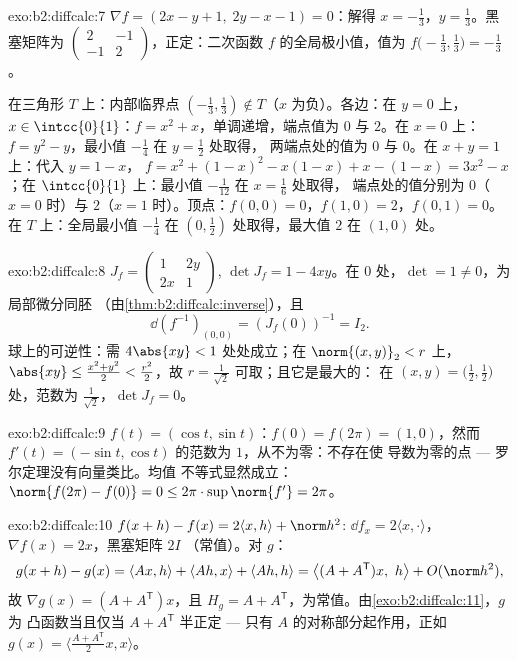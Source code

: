 \begin{solution}{exo:b2:diffcalc:7}
$\nabla f = (2x - y + 1,\; 2y - x - 1) = 0$：解得 $x =
-\frac13$，$y = \frac13$。黑塞矩阵为 $\begin{pmatrix} 2 & -1\\ -1 &
2\end{pmatrix}$，正定：二次函数
$f$ 的全局极小值，值为 $f\bigl(-\frac13, \frac13\bigr) = -\frac13$。

在三角形 $T$ 上：内部临界点 $(-\frac13,
\frac13) \notin T$（$x$ 为负）。各边：在 $y = 0$ 上，$x \in
\intcc{0}{1}$：$f = x^2 + x$，单调递增，端点值为 $0$ 与 $2$。在
$x = 0$ 上：$f = y^2 - y$，最小值 $-\frac14$ 在 $y = \frac12$ 处取得，
两端点处的值为 $0$ 与 $0$。在 $x + y = 1$ 上：代入 $y = 1 - x$，
$f = x^2 + (1-x)^2 - x(1-x) + x - (1-x) = 3x^2 - x$；在
$\intcc{0}{1}$ 上：最小值 $-\frac{1}{12}$ 在 $x = \frac16$ 处取得，
端点处的值分别为 $0$（$x=0$ 时）与 $2$（$x=1$ 时）。顶点：$f(0,0) = 0$，$f(1,0)
= 2$，$f(0,1) = 0$。在 $T$ 上：全局最小值 $-\frac14$ 在 $(0,
\frac12)$ 处取得，最大值 $2$ 在 $(1, 0)$ 处。
\end{solution}

\begin{solution}{exo:b2:diffcalc:8}
$J_f = \begin{pmatrix} 1 & 2y\\ 2x & 1\end{pmatrix}$, $\det J_f =
1 - 4xy$。在 $0$ 处，$\det = 1 \neq 0$，为局部微分同胚
（由\cref{thm:b2:diffcalc:inverse}），且
\[
\dd(f^{-1})_{(0,0)} = (J_f(0))^{-1} = I_2 .
\]
球上的可逆性：需 $4\abs{xy} < 1$ 处处成立；在
$\norm{(x,y)}_2 < r$ 上，$\abs{xy} \leq \frac{x^2 + y^2}{2} <
\frac{r^2}{2}$，故 $r = \frac{1}{\sqrt2}$ 可取；且它是最大的：
在 $(x, y) = \bigl(\tfrac12, \tfrac12\bigr)$ 处，范数为
$\frac{1}{\sqrt2}$，$\det J_f = 0$。
\end{solution}

\begin{solution}{exo:b2:diffcalc:9}
$f(t) = (\cos t, \sin t)$：$f(0) = f(2\pi) = (1, 0)$，然而 $f'(t) =
(-\sin t, \cos t)$ 的范数为 $1$，从不为零：不存在使
导数为零的点 --- 罗尔定理没有向量类比。均值
不等式显然成立：$\norm{f(2\pi) - f(0)} = 0 \leq
2\pi \cdot \sup\norm{f'} = 2\pi$。
\end{solution}

\begin{solution}{exo:b2:diffcalc:10}
$f(x+h) - f(x) = 2\langle x, h\rangle + \norm h^2$: $\dd f_x =
2\langle x, \cdot\rangle$，$\nabla f(x) = 2x$，黑塞矩阵 $2I$
（常值）。对 $g$：
\[
g(x + h) - g(x) = \langle Ax, h\rangle + \langle Ah, x\rangle
+ \langle Ah, h\rangle
= \bigl\langle (A + A^{\mathsf T})x,\ h\bigr\rangle +
O(\norm h^2),
\]
故 $\nabla g(x) = (A + A^{\mathsf T})x$，且 $H_g = A +
A^{\mathsf T}$，为常值。由\cref{exo:b2:diffcalc:11}，$g$ 为
凸函数当且仅当 $A + A^{\mathsf T}$ 半正定 ---
只有 $A$ 的对称部分起作用，正如 $g(x) =
\langle \frac{A + A^{\mathsf T}}2 x, x\rangle$。
\end{solution}

